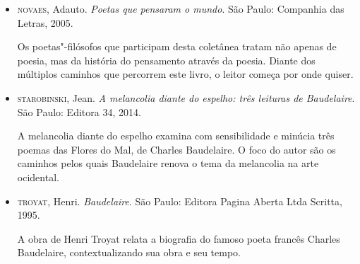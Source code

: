 \documentclass[12pt]{extarticle}
\begin{document}
\begin{itemize}
\item\textsc{novaes}, Adauto. \textit{Poetas que pensaram o mundo}. São Paulo:
Companhia das Letras, 2005.

Os poetas"-filósofos que participam desta coletânea tratam não apenas de
poesia, mas da história do pensamento através da poesia. Diante dos
múltiplos caminhos que percorrem este livro, o leitor começa por onde
quiser.

\item\textsc{starobinski}, Jean. \textit{A melancolia diante do espelho: três leituras de Baudelaire}. São Paulo: Editora 34, 2014.

A melancolia diante do espelho examina com sensibilidade e minúcia três
poemas das Flores do Mal, de Charles Baudelaire. O foco do autor são os
caminhos pelos quais Baudelaire renova o tema da melancolia na arte
ocidental.

\item\textsc{troyat}, Henri. \textit{Baudelaire}. São Paulo: Editora Pagina Aberta Ltda Scritta, 1995.

A obra de Henri Troyat relata a biografia do famoso poeta francês
Charles Baudelaire, contextualizando sua obra e seu tempo.
\end{itemize}
\end{document}
